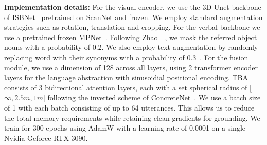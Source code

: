 \documentclass[10pt,twocolumn,letterpaper]{article}
\begin{document}
\noindent \textbf{Implementation details:} For the visual encoder, we use the 3D Unet backbone of ISBNet~\cite{ngo2023isbnet} pretrained on ScanNet and frozen. We employ standard augmentation strategies such as rotation, translation and cropping. For the verbal backbone we use a pretrained frozen MPNet~\cite{song2020mpnet}. Following Zhao~\etal~\cite{zhao2021_3DVG_Transformer}, we mask the referred object nouns with a probability of 0.2. We also employ text augmentation by randomly replacing word with their synonyms with a probability of 0.3~\cite{EDA}. For the fusion module, we use a dimension of 128 across all layers, using 2 transformer encoder layers for the language abstraction with sinusoidial positional encoding. TBA consists of 3 bidirectional attention layers, each with a set spherical radius of [$\infty, 2.5m, 1m$] following the inverted scheme of ConcreteNet~\cite{unal2023ways}. We use a batch size of 1 with each batch consisting of up to 64 utterances. This allows us to reduce the total memory requirements while retaining clean gradients for grounding. We train for 300 epochs using AdamW with a learning rate of 0.0001 on a single Nvidia Geforce RTX 3090.

\end{document}
